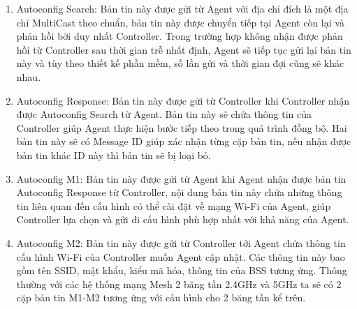 \begin{enumerate}
\item Autoconfig Search: Bản tin này được gửi từ Agent với địa chỉ đích là một địa chỉ MultiCast theo chuẩn, bản tin này được chuyển tiếp tại Agent còn lại và phản hồi bởi duy nhất Controller. Trong trường hợp không nhận được phản hồi từ Controller sau thời gian trễ nhất định, Agent sẽ tiếp tục gửi lại bản tin này và tùy theo thiết kế phần mềm, số lần gửi và thời gian đợi cũng sẽ khác nhau.
\item Autoconfig Response: Bản tin này được gửi từ Controller khi Controller nhận được Autoconfig Search từ Agent. Bản tin này sẽ chứa thông tin của Controller giúp Agent thực hiện bước tiếp theo trong quá trình đồng bộ. Hai bản tin này sẽ có Message ID giúp xác nhận từng cặp bản tin, nếu nhận được bản tin khác ID này thì bản tin sẽ bị loại bỏ.
\item Autoconfig M1: Bản tin này được gửi từ Agent khi Agent nhận được bản tin Autoconfig Response từ Controller, nội dung bản tin này chứa những thông tin liên quan đến cấu hình có thể cài đặt về mạng Wi-Fi của Agent, giúp Controller lựa chọn và gửi đi cấu hình phù hợp nhất với khả năng của Agent. 
\item Autoconfig M2: Bản tin này được gửi từ Controller tới Agent chứa thông tin cấu hình Wi-Fi của Controller muốn Agent cập nhật. Các thông tin này bao gồm tên SSID, mật khẩu, kiểu mã hóa, thông tin của BSS tương ứng. Thông thường với các hệ thống mạng Mesh 2 băng tần 2.4GHz và 5GHz ta sẽ có 2 cặp bản tin M1-M2 tương ứng với cấu hình cho 2 băng tần kể trên.
\end{enumerate}

